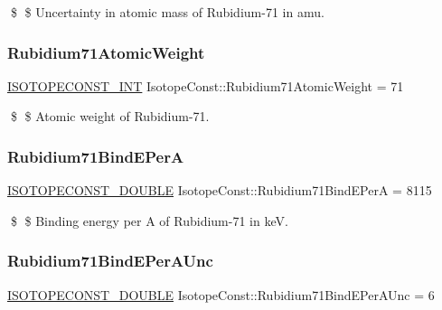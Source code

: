 \$ \$ Uncertainty in atomic mass of Rubidium-\/71 in amu. \mbox{\label{group___isotope_const-_rubidium-_rb71_ga444116d601dbe14035470dba40f194c3}} 
\subsubsection{\texorpdfstring{Rubidium71\+Atomic\+Weight}{Rubidium71AtomicWeight}}
{\footnotesize\ttfamily \mbox{\hyperlink{group___isotope_const-_macros_ga5f18360b3e99483a35c32d789e62621c}{I\+S\+O\+T\+O\+P\+E\+C\+O\+N\+S\+T\+\_\+\+I\+NT}} Isotope\+Const\+::\+Rubidium71\+Atomic\+Weight = 71}

\$ \$ Atomic weight of Rubidium-\/71. \mbox{\label{group___isotope_const-_rubidium-_rb71_gac0fa362cbbbffdcf85fa089a11607948}} 
\subsubsection{\texorpdfstring{Rubidium71\+Bind\+E\+PerA}{Rubidium71BindEPerA}}
{\footnotesize\ttfamily \mbox{\hyperlink{group___isotope_const-_macros_ga8f45a7272ce02c0b4c65c44636ed719a}{I\+S\+O\+T\+O\+P\+E\+C\+O\+N\+S\+T\+\_\+\+D\+O\+U\+B\+LE}} Isotope\+Const\+::\+Rubidium71\+Bind\+E\+PerA = 8115}

\$ \$ Binding energy per A of Rubidium-\/71 in keV. \mbox{\label{group___isotope_const-_rubidium-_rb71_ga73afbfd4751cfc83ca60dcba086f9763}} 
\subsubsection{\texorpdfstring{Rubidium71\+Bind\+E\+Per\+A\+Unc}{Rubidium71BindEPerAUnc}}
{\footnotesize\ttfamily \mbox{\hyperlink{group___isotope_const-_macros_ga8f45a7272ce02c0b4c65c44636ed719a}{I\+S\+O\+T\+O\+P\+E\+C\+O\+N\+S\+T\+\_\+\+D\+O\+U\+B\+LE}} Isotope\+Const\+::\+Rubidium71\+Bind\+E\+Per\+A\+Unc = 6}

